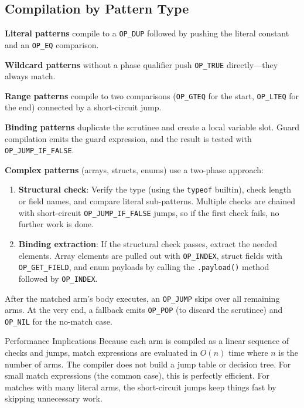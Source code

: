 \subsection{Compilation by Pattern Type}\label{sec:compilation-by-type}

\textbf{Literal patterns} compile to a \lstinline|OP_DUP| followed by pushing the literal constant and an \lstinline|OP_EQ| comparison.

\textbf{Wildcard patterns} without a phase qualifier push \lstinline|OP_TRUE| directly---they always match.

\textbf{Range patterns} compile to two comparisons (\lstinline|OP_GTEQ| for the start, \lstinline|OP_LTEQ| for the end) connected by a short-circuit jump.

\textbf{Binding patterns} duplicate the scrutinee and create a local variable slot. Guard compilation emits the guard expression, and the result is tested with \lstinline|OP_JUMP_IF_FALSE|.

\textbf{Complex patterns} (arrays, structs, enums) use a two-phase approach:
\begin{enumerate}
  \item \textbf{Structural check}: Verify the type (using the \lstinline|typeof| builtin), check length or field names, and compare literal sub-patterns. Multiple checks are chained with short-circuit \lstinline|OP_JUMP_IF_FALSE| jumps, so if the first check fails, no further work is done.
  \item \textbf{Binding extraction}: If the structural check passes, extract the needed elements. Array elements are pulled out with \lstinline|OP_INDEX|, struct fields with \lstinline|OP_GET_FIELD|, and enum payloads by calling the \lstinline|.payload()| method followed by \lstinline|OP_INDEX|.
\end{enumerate}

After the matched arm's body executes, an \lstinline|OP_JUMP| skips over all remaining arms. At the very end, a fallback emits \lstinline|OP_POP| (to discard the scrutinee) and \lstinline|OP_NIL| for the no-match case.

\begin{notebox}{Performance Implications}
Because each arm is compiled as a linear sequence of checks and jumps, match expressions are evaluated in $O(n)$ time where $n$ is the number of arms. The compiler does not build a jump table or decision tree. For small match expressions (the common case), this is perfectly efficient. For matches with many literal arms, the short-circuit jumps keep things fast by skipping unnecessary work.
\end{notebox}

